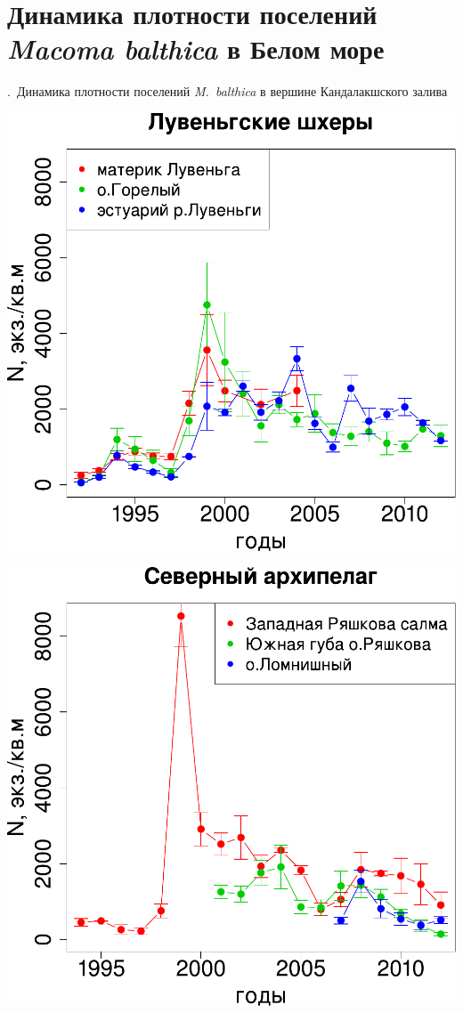\documentclass[aspectratio=169, xcolor=table]{beamer}
\begin{document}
		\section[Динамика численности]{Динамика плотности поселений {\it Macoma balthica} в Белом море}
\begin{frame}{\insertpagenumber.\ Динамика плотности поселений {\it M.~balthica} в вершине Кандалакшского залива}
	\begin{minipage}[t]{.49\linewidth}
		\begin{center}
			\includegraphics[width=\textwidth]{N2_dynamic_Luvenga_big1.pdf}
		\end{center}
	\end{minipage}
%
	\begin{minipage}[t]{.49\linewidth}
		\begin{center}
			\includegraphics[width=\textwidth]{N2_dynamic_North_big1.pdf}

\end{center}
\end{minipage}
\end{frame}
\end{document}
